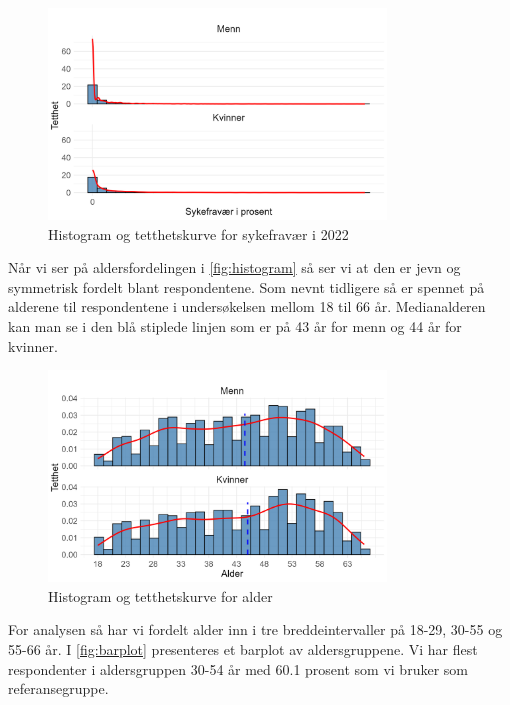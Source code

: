 \documentclass[
  12pt,
  a4paper,
  DIV=11,
  numbers=noendperiod]{scrartcl}
\begin{document}
\begin{figure}[H]
\caption{Histogram og tetthetskurve for sykefravær i 2022}
\label{fig:histogram}
\centering
\includegraphics[width=0.8\textwidth]{dokumentobjekter/figurer/fig_1.png}
\end{figure}

Når vi ser på aldersfordelingen i \autoref{fig:histogram} så ser vi at
den er jevn og symmetrisk fordelt blant respondentene. Som nevnt
tidligere så er spennet på alderene til respondentene i undersøkelsen
mellom 18 til 66 år. Medianalderen kan man se i den blå stiplede linjen
som er på 43 år for menn og 44 år for kvinner.

\begin{figure}[H]
\caption{Histogram og tetthetskurve for alder}
\label{fig:histogram}
\centering
\includegraphics[width=0.8\textwidth]{dokumentobjekter/figurer/fig_2.png}
\end{figure}

For analysen så har vi fordelt alder inn i tre breddeintervaller på
18-29, 30-55 og 55-66 år. I \autoref{fig:barplot} presenteres et barplot
av aldersgruppene. Vi har flest respondenter i aldersgruppen 30-54 år
med 60.1 prosent som vi bruker som referansegruppe.
\end{document}
